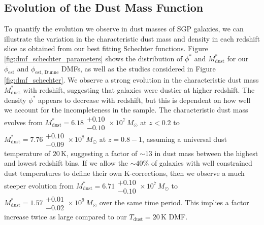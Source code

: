 \subsection{Evolution of the Dust Mass Function}

To quantify the evolution we observe in dust masses of SGP galaxies, we can illustrate the variation in the characteristic dust mass and density in each redshift slice as obtained from our best fitting Schechter functions. Figure \ref{fig:dmf_schechter_parameters} shows the distribution of $\phi^*$ and $M_{\textrm{dust}}^*$ for our $\phi_{\textrm{est}}$ and $\phi_{\textrm{est, Dunne}}$ DMFs, as well as the studies considered in Figure \ref{fig:dmf_schechter}. We observe a strong evolution in the characteristic dust mass $M_{\textrm{dust}}^*$ with redshift, suggesting that galaxies were dustier at higher redshift. The density $\phi^*$ appears to decrease with redshift, but this is dependent on how well we account for the incompleteness in the sample. The characteristic dust mass evolves from $M_{\textrm{dust}}^* = 6.18\substack{+0.10\\-0.10}\times10^7\,M_{\odot}$ at $z < 0.2$ to $M_{\textrm{dust}}^* = 7.76\substack{+0.10\\-0.09}\times10^8\,M_{\odot}$ at $z = 0.8 - 1$, assuming a universal dust temperature of $20\,$K, suggesting a factor of $\sim 13$ in dust mass between the highest and lowest redshift bins. If we allow the $\sim 40\%$ of galaxies with well constrained dust temperatures to define their own K-corrections, then we observe a much steeper evolution from $M_{\textrm{dust}}^* = 6.71\substack{+0.10\\-0.10}\times10^7\,M_{\odot}$ to $M_{\textrm{dust}}^* = 1.57\substack{+0.01\\-0.02}\times10^9\,M_{\odot}$ over the same time period. This implies a factor increase twice as large compared to our $T_{\textrm{dust}} = 20\,$K DMF.

